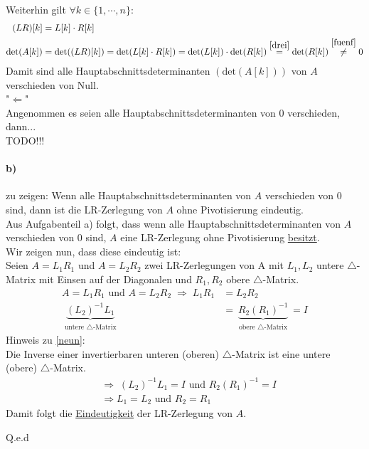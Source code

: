 Weiterhin gilt $\forall k \in\{1,\cdots,n\}$:
\begin{align}
(LR)[k]&=L[k]\cdot R[k]\\
\mathrm{det}(A[k])&=\mathrm{det}((LR)[k])= \mathrm{det}(L[k]\cdot R[k])= \mathrm{det}(L[k])\cdot\mathrm{det}(R[k]) \overset{\eqref{drei}}{=} \mathrm{det}(R[k])\overset{\eqref{fuenf}}{\neq}0
\end{align}
Damit sind alle Hauptabschnittsdeterminanten $\left(\mathrm{det}(A[k])\right)$ von $A$ verschieden von Null.\\
\newline
"$\Leftarrow$"\\
Angenommen es seien alle Hauptabschnittsdeterminanten von 0 verschieden, dann...\\
TODO!!!



\paragraph*{b)}
zu zeigen: Wenn alle Hauptabschnittsdeterminanten von $A$ verschieden von 0 sind, dann ist die LR-Zerlegung von $A$ ohne Pivotisierung eindeutig.\\
\newline
Aus Aufgabenteil a) folgt, dass \glqq wenn alle Hauptabschnittsdeterminanten von $A$ verschieden von 0 sind, $A$ eine LR-Zerlegung ohne Pivotisierung \underline{besitzt}.\grqq\\
\newline
Wir zeigen nun, dass diese eindeutig ist:\\
\newline
Seien $ A = L_1R_1 $ und $ A = L_2R_2 $ zwei LR-Zerlegungen von A mit $L_1,L_2$ untere $\triangle$-Matrix mit Einsen auf der Diagonalen und $R_1,R_2$ obere $\triangle$-Matrix.
\begin{align}
	 A = L_1R_1 \text{ und } A = L_2R_2 \;\Rightarrow \; L_1R_1 &=  L_2R_2\\\label{neun}
	 \underbrace{(L_2)^{-1}L_1}_{\substack{\text{untere }\triangle\text{-Matrix}}}
	 &=  \underbrace{R_2(R_1)^{-1}}_{\substack{\text{obere }\triangle\text{-Matrix}}} = I
\end{align}
Hinweis zu \eqref{neun}:\\ Die Inverse einer invertierbaren unteren (oberen) $\triangle$-Matrix ist eine untere (obere) $\triangle$-Matrix.\\
\begin{align}
&\Rightarrow \; (L_2)^{-1}L_1 = I \text{ und } R_2(R_1)^{-1}=I\\
&\Rightarrow L_1=L_2 \text{ und } R_2=R_1
\end{align}
Damit folgt die \underline{Eindeutigkeit} der LR-Zerlegung von $A$.
\begin{flushright}Q.e.d\end{flushright}
